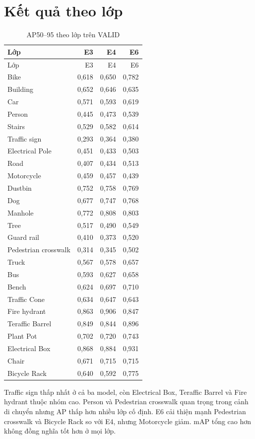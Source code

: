 \documentclass[12pt,a4paper,oneside]{report}
\begin{document}
\section{Kết quả theo lớp}
\begin{longtable}{lrrr}
\caption{AP50--95 theo lớp trên VALID}\label{tab:perclass}\\
\toprule Lớp & E3 & E4 & E6\\\midrule\endfirsthead
\toprule Lớp & E3 & E4 & E6\\\midrule\endhead
Bike & 0,618 & 0,650 & 0,782\\ Building & 0,652 & 0,646 & 0,635\\
Car & 0,571 & 0,593 & 0,619\\ Person & 0,445 & 0,473 & 0,539\\
Stairs & 0,529 & 0,582 & 0,614\\ Traffic sign & 0,293 & 0,364 & 0,380\\
Electrical Pole & 0,451 & 0,433 & 0,503\\ Road & 0,407 & 0,434 & 0,513\\
Motorcycle & 0,459 & 0,457 & 0,439\\ Dustbin & 0,752 & 0,758 & 0,769\\
Dog & 0,677 & 0,747 & 0,768\\ Manhole & 0,772 & 0,808 & 0,803\\
Tree & 0,517 & 0,490 & 0,549\\ Guard rail & 0,410 & 0,373 & 0,520\\
Pedestrian crosswalk & 0,314 & 0,345 & 0,502\\ Truck & 0,567 & 0,578 & 0,657\\
Bus & 0,593 & 0,627 & 0,658\\ Bench & 0,624 & 0,697 & 0,710\\
Traffic Cone & 0,634 & 0,647 & 0,643\\ Fire hydrant & 0,863 & 0,906 & 0,847\\
Teraffic Barrel & 0,849 & 0,844 & 0,896\\ Plant Pot & 0,702 & 0,720 & 0,743\\
Electrical Box & 0,868 & 0,884 & 0,931\\ Chair & 0,671 & 0,715 & 0,715\\
Bicycle Rack & 0,640 & 0,592 & 0,775\\\bottomrule
\end{longtable}

Traffic sign thấp nhất ở cả ba model, còn Electrical Box, Teraffic Barrel và Fire hydrant thuộc nhóm cao. Person và Pedestrian crosswalk quan trọng trong cảnh di chuyển nhưng AP thấp hơn nhiều lớp cố định. E6 cải thiện mạnh Pedestrian crosswalk và Bicycle Rack so với E4, nhưng Motorcycle giảm. mAP tổng cao hơn không đồng nghĩa tốt hơn ở mọi lớp.
\end{document}
